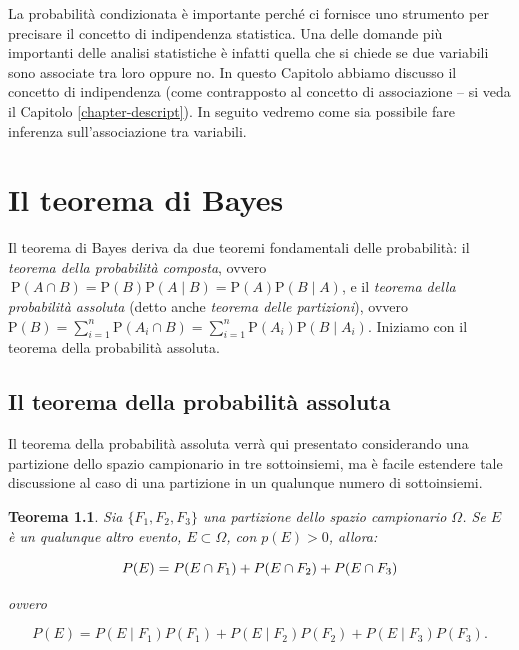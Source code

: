 \documentclass[
  11pt,
]{krantz}
\newtheorem{theorem}{Teorema}[chapter]
\theoremstyle{definition}
\theoremstyle{definition}
\theoremstyle{definition}
\theoremstyle{definition}
\theoremstyle{remark}
\begin{document}
La probabilità condizionata è importante perché ci fornisce uno strumento per precisare il concetto di indipendenza statistica. Una delle domande più importanti delle analisi statistiche è infatti quella che si chiede se due variabili sono associate tra loro oppure no. In questo Capitolo abbiamo discusso il concetto di indipendenza (come contrapposto al concetto di associazione -- si veda il Capitolo \ref{chapter-descript}). In seguito vedremo come sia possibile fare inferenza sull'associazione tra variabili.

\hypertarget{chapter-teo-bayes}{%
\chapter{Il teorema di Bayes}\label{chapter-teo-bayes}}

Il teorema di Bayes deriva da due teoremi fondamentali delle probabilità: il \emph{teorema della probabilità composta}, ovvero \(\ {\mbox{P}}(A\cap B)={\mbox{P}}(B){\mbox{P}}(A \mid B)={\mbox{P}}(A){\mbox{P}}(B \mid A)\), e il \emph{teorema della probabilità assoluta} (detto anche \emph{teorema delle partizioni}), ovvero \({\mbox{P}}(B)=\sum _{{i=1}}^{n}{\mbox{P}}(A_{i}\cap B)=\sum _{{i=1}}^{n}{\mbox{P}}(A_{i}){\mbox{P}}(B \mid A_{i})\). Iniziamo con il teorema della probabilità assoluta.

\hypertarget{il-teorema-della-probabilituxe0-assoluta}{%
\section{Il teorema della probabilità assoluta}\label{il-teorema-della-probabilituxe0-assoluta}}

Il teorema della probabilità assoluta verrà qui presentato considerando una partizione dello spazio campionario in tre sottoinsiemi, ma è facile estendere tale discussione al caso di una partizione in un qualunque numero di sottoinsiemi.

\begin{theorem}
Sia \(\{F_1, F_2, F_3\}\) una partizione dello spazio campionario \(\Omega\). Se \(E\) è un qualunque altro evento, \(E \subset \Omega\), con \(p(E) > 0\), allora:

\begin{equation}
P(E) = P(E \cap F_1) + P(E \cap F_2) + P(E \cap F_3) \notag
\label{eq:prob-total-1a}
\end{equation}

ovvero

\begin{equation}
P(E) = P(E \mid F_1) P(F_1) + P (E \mid F_2) P(F_2) + P(E \mid F_3) P(F_3).
\label{eq:prob-total-1b}
\end{equation}
\end{theorem}
\end{document}
